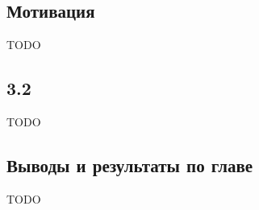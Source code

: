 \documentclass[../diploma.tex]{subfiles}
\begin{document}
\label{sec:3}

\subsection{Мотивация}

TODO

\subsection{3.2}

TODO

\subsection{Выводы и результаты по главе}

TODO
\end{document}
